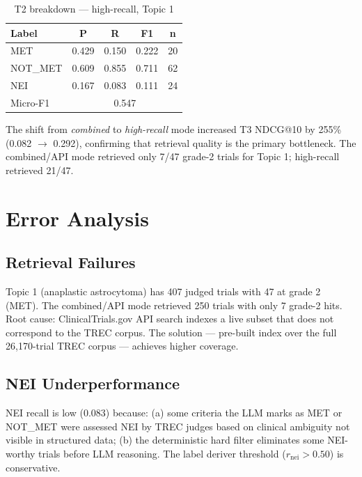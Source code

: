 \documentclass[10pt,twocolumn]{article}
\begin{document}
\begin{table}[H]
\centering
\caption{T2 breakdown — high-recall, Topic 1}
\label{tab:t2}
\small
\begin{tabular}{lcccc}
\toprule
\textbf{Label} & \textbf{P} & \textbf{R} & \textbf{F1} & \textbf{n} \\
\midrule
MET     & 0.429 & 0.150 & 0.222 & 20 \\
NOT\_MET & 0.609 & 0.855 & 0.711 & 62 \\
NEI     & 0.167 & 0.083 & 0.111 & 24 \\
\midrule
Micro-F1 & \multicolumn{4}{c}{0.547} \\
\bottomrule
\end{tabular}
\end{table}

The shift from \textit{combined} to \textit{high-recall} mode increased T3 NDCG@10
by 255\% (0.082 $\rightarrow$ 0.292), confirming that retrieval quality is the
primary bottleneck. The combined/API mode retrieved only 7/47 grade-2 trials for
Topic 1; high-recall retrieved 21/47.

\section{Error Analysis}
\label{sec:error}

\subsection{Retrieval Failures}

Topic 1 (anaplastic astrocytoma) has 407 judged trials with 47 at grade 2 (MET).
The combined/API mode retrieved 250 trials with only 7 grade-2 hits.
Root cause: ClinicalTrials.gov API search indexes a live subset that does not
correspond to the TREC corpus. The solution — pre-built index over the full
26,170-trial TREC corpus — achieves higher coverage.

\subsection{NEI Underperformance}

NEI recall is low (0.083) because: (a) some criteria the LLM marks as MET or NOT\_MET
were assessed NEI by TREC judges based on clinical ambiguity not visible in structured
data; (b) the deterministic hard filter eliminates some NEI-worthy trials before
LLM reasoning. The label deriver threshold ($r_{\text{nei}} > 0.50$) is conservative.
\end{document}
